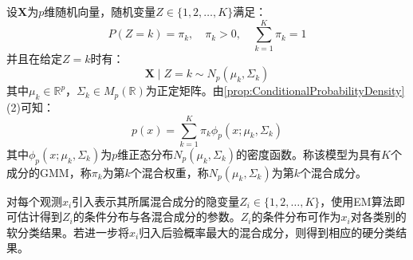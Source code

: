\begin{definition}
	设$\mathbf{X}$为$p$维随机向量，随机变量$Z\in\{1,2,\dots,K\}$满足：
	\begin{equation*}
		P(Z=k)=\pi_k,\quad\pi_k>0,\quad\sum_{k=1}^{K}\pi_k=1
	\end{equation*}
	并且在给定$Z=k$时有：
	\begin{equation*}
		\mathbf{X}\mid Z=k\sim N_p(\mu_k,\Sigma_k)
	\end{equation*}
	其中$\mu_k\in\mathbb{R}^p$，$\Sigma_k\in M_p(\mathbb{R})$为正定矩阵。由\cref{prop:ConditionalProbabilityDensity}(2)可知：
	\begin{equation*}
		p(x)=\sum_{k=1}^{K}\pi_k\phi_p(x;\mu_k,\Sigma_k)
	\end{equation*}
	其中$\phi_p(x;\mu_k,\Sigma_k)$为$p$维正态分布$N_p(\mu_k,\Sigma_k)$的密度函数。称该模型为具有$K$个成分的\gls{GMM}，称$\pi_k$为第$k$个混合权重，称$N_p(\mu_k,\Sigma_k)$为第$k$个混合成分。
\end{definition}
对每个观测$x_i$引入表示其所属混合成分的隐变量$Z_i\in\{1,2,\dots,K\}$，使用EM算法即可估计得到$Z_i$的条件分布与各混合成分的参数。$Z_i$的条件分布可作为$x_i$对各类别的软分类结果。若进一步将$x_i$归入后验概率最大的混合成分，则得到相应的硬分类结果。

